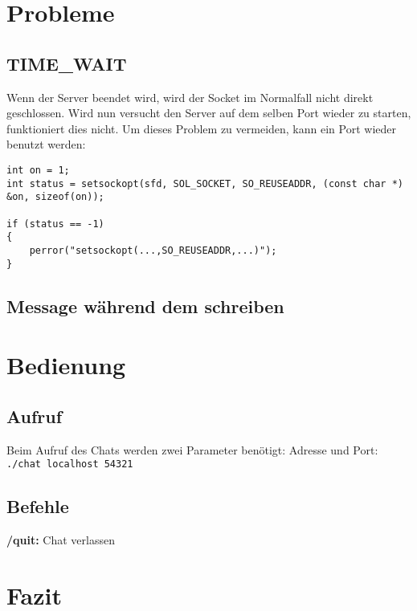 \documentclass[a4paper]{article}
\begin{document}
\section{Probleme}
\subsection{TIME\_WAIT}
Wenn der Server beendet wird, wird der Socket im Normalfall nicht direkt geschlossen. Wird nun versucht den Server auf dem selben Port wieder zu starten, funktioniert dies nicht. Um dieses Problem zu vermeiden, kann ein Port wieder benutzt werden:

\begin{verbatim}
int on = 1;
int status = setsockopt(sfd, SOL_SOCKET, SO_REUSEADDR, (const char *) &on, sizeof(on));

if (status == -1) 
{   
    perror("setsockopt(...,SO_REUSEADDR,...)");
}
\end{verbatim}

\subsection{Message während dem schreiben}
\section{Bedienung}
\subsection{Aufruf}
Beim Aufruf des Chats werden zwei Parameter benötigt: Adresse und Port:
\texttt{./chat localhost 54321}

\subsection{Befehle}
\textbf{/quit:} Chat verlassen

\section{Fazit}
\end{document}
